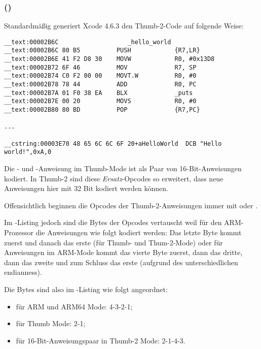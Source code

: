 \subsubsection{\OptimizingXcodeIV (\ThumbTwoMode)}

Standardmäßig generiert Xcode 4.6.3 den Thumb-2-Code auf folgende Weise:

\begin{lstlisting}[caption=\OptimizingXcodeIV (\ThumbTwoMode),style=customasmARM]
__text:00002B6C                   _hello_world
__text:00002B6C 80 B5          PUSH            {R7,LR}
__text:00002B6E 41 F2 D8 30    MOVW            R0, #0x13D8
__text:00002B72 6F 46          MOV             R7, SP
__text:00002B74 C0 F2 00 00    MOVT.W          R0, #0
__text:00002B78 78 44          ADD             R0, PC
__text:00002B7A 01 F0 38 EA    BLX             _puts
__text:00002B7E 00 20          MOVS            R0, #0
__text:00002B80 80 BD          POP             {R7,PC}

...

__cstring:00003E70 48 65 6C 6C 6F 20+aHelloWorld  DCB "Hello world!",0xA,0
\end{lstlisting}


\myindex{\ThumbTwoMode}

Die - und -Anweisung im Thumb-Mode ist als Paar von 16-Bit-Anweisungen kodiert.
In Thumb-2 sind diese \emph{Ersatz}-Opcodes so erweitert, dass neue Anweisungen hier mit 32 Bit
kodiert werden können.

Offensichtlich beginnen die Opcodes der Thumb-2-Anweisungen immer mit  oder .

Im \IDA-Listing jedoch sind die Bytes der Opcodes vertauscht weil für den ARM-Prozessor die
Anweisungen wie folgt kodiert werden:
Das letzte Byte kommt zuerst und danach das erste (für Thumb- und Thum-2-Mode) oder für
Anweisungen im ARM-Mode kommt das vierte Byte zuerst, dann das dritte, dann das zweite und
zum Schluss das erste (aufgrund des unterschiedlichen \gls{endianness}).

Die Bytes sind also im \IDA-Listing wie folgt angeordnet:
\begin{itemize}
\item für ARM und ARM64 Mode: 4-3-2-1;
\item für Thumb Mode: 2-1;
\item für 16-Bit-Anweisungspaar in Thumb-2 Mode: 2-1-4-3.
\end{itemize}

